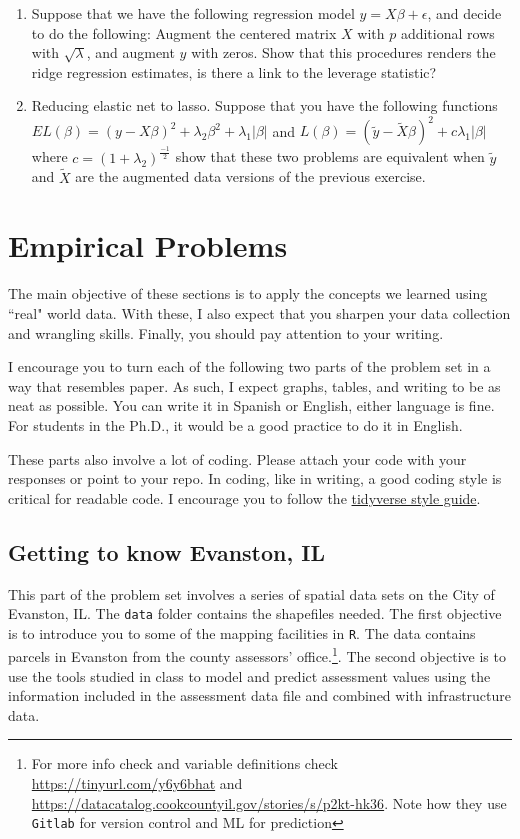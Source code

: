 \documentclass[12pt,onecolumn]{article}
\begin{document}
\begin{enumerate}
  \item Suppose that we have the following regression model  $y=X\beta +\epsilon$, and decide to do the following: Augment the centered matrix $X$ with $p$ additional rows with $\sqrt{\lambda}$, and augment $y$ with zeros. Show that this procedures renders the ridge regression estimates, is there a link to the leverage statistic?

  \item Reducing elastic net to lasso. Suppose that you have the following functions $EL(\beta) = (y-X\beta)^2+ \lambda_2 \beta^2+ \lambda_1|\beta|$ and $L(\beta) = (\tilde{y}-\tilde{X}\beta)^2+ c \lambda_1|\beta|$ where $c=(1+\lambda_2)^{\frac{-1}{2}}$ show that these two problems are equivalent when $\tilde{y}$ and $\tilde{X}$ are the augmented data versions of the previous exercise.
\end{enumerate}

 

\section{Empirical Problems}

The main objective of these sections is to apply the concepts we learned using ``real" world data. With these, I also expect that you sharpen your data collection and wrangling skills. Finally, you should pay attention to your writing.

I encourage you to turn each of the following two parts of the problem set in a way that resembles paper. As such, I expect graphs, tables, and writing to be as neat as possible. You can write it in Spanish or English, either language is fine. For students in the Ph.D., it would be a good practice to do it in English.

These parts also involve a lot of coding. Please attach your code with your responses or point to your repo. In coding, like in writing, a good coding style is critical for readable code. I encourage you to follow the \href{https://style.tidyverse.org/}{tidyverse style guide}.


\subsection{Getting to know Evanston, IL}

This part of the problem set involves a series of spatial data sets on the City of Evanston, IL. The \texttt{data} folder contains the shapefiles needed. The first objective is to introduce you to some of the mapping facilities in \texttt{R}.  The data contains parcels in Evanston from the county assessors' office.\footnote{For more info check and variable definitions check \url{https://tinyurl.com/y6y6bhat} and \url{https://datacatalog.cookcountyil.gov/stories/s/p2kt-hk36}. Note how they use \texttt{Gitlab} for version control and ML for prediction}. The second objective is to use the tools studied in class to model and predict assessment values using the information included in the assessment data file and combined with infrastructure data.
\end{document}
